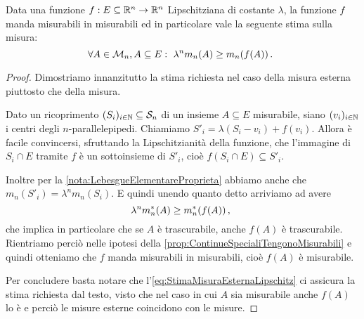\begin{proposition}\label{prop:LipschitzTengonoMisurabili}
	Data una funzione $f:E\subseteq \mathbb R^n\to\mathbb R^n$ Lipschitziana di costante $\lambda$, la funzione $f$ manda misurabili in misurabili ed in particolare vale la seguente stima sulla misura:
	\begin{equation*}
		\forall A\in\mathcal M_n, A\subseteq E:\ \lambda^n m_n(A) \ge m_n(f(A)) \, \text{. }
	\end{equation*}
\end{proposition}
\begin{proof}
	Dimostriamo innanzitutto la stima richiesta nel caso della misura esterna piuttosto che della misura.
	
	Dato un ricoprimento $(S_i)_{i\in\mathbb N}\subseteq \mathcal S_n$ di un insieme $A\subseteq E$ misurabile, siano $(v_i)_{i\in\mathbb N}$ i centri degli $n$-parallelepipedi.
	Chiamiamo $S'_i=\lambda(S_i-v_i)+f(v_i)$.
	Allora è facile convincersi, sfruttando la Lipschitzianità della funzione, che l'immagine di $S_i\cap E$ tramite $f$ è un sottoinsieme di $S'_i$, cioè $f(S_i\cap E)\subseteq S'_i$.
	
	Inoltre per la \cref{nota:LebesgueElementareProprieta} abbiamo anche che $m_n(S'_i)=\lambda^n m_n(S_i)$. 
	E quindi unendo quanto detto arriviamo ad avere
	\begin{equation}\label{eq:StimaMisuraEsternaLipschitz}
		\lambda^n m_n^*(A) \ge m_n^*(f(A))  \, \text{, }
	\end{equation}
	che implica in particolare che se $A$ è trascurabile, anche $f(A)$ è trascurabile.
	Rientriamo perciò nelle ipotesi della \cref{prop:ContinueSpecialiTengonoMisurabili} e quindi otteniamo che $f$ manda misurabili in misurabili, cioè $f(A)$ è misurabile.
	
	Per concludere basta notare che l'\cref{eq:StimaMisuraEsternaLipschitz} ci assicura la stima richiesta dal testo, visto che nel caso in cui $A$ sia misurabile anche $f(A)$ lo è e perciò le misure esterne coincidono con le misure.
\end{proof}

